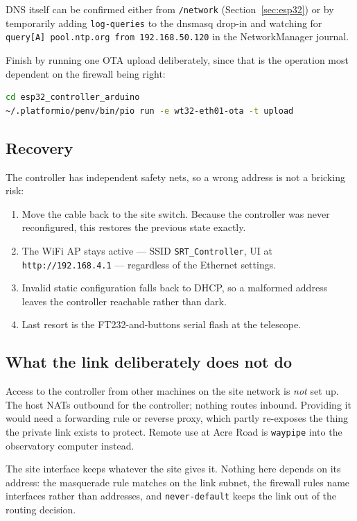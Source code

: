 \documentclass[11pt,a4paper]{article}
\begin{document}
DNS itself can be confirmed either from \texttt{/network} (Section~\ref{sec:esp32}) or by temporarily adding \texttt{log-queries} to the dnsmasq drop-in and watching for \texttt{query[A] pool.ntp.org from 192.168.50.120} in the NetworkManager journal.

Finish by running one OTA upload deliberately, since that is the operation most dependent on the firewall being right:

\begin{lstlisting}[language=bash]
cd esp32_controller_arduino
~/.platformio/penv/bin/pio run -e wt32-eth01-ota -t upload
\end{lstlisting}

\subsection{Recovery}

The controller has independent safety nets, so a wrong address is not a bricking risk:

\begin{enumerate}
    \item Move the cable back to the site switch. Because the controller was never reconfigured, this restores the previous state exactly.
    \item The WiFi AP stays active --- SSID \texttt{SRT\_Controller}, UI at \texttt{http://192.168.4.1} --- regardless of the Ethernet settings.
    \item Invalid static configuration falls back to DHCP, so a malformed address leaves the controller reachable rather than dark.
    \item Last resort is the FT232-and-buttons serial flash at the telescope.
\end{enumerate}

\subsection{What the link deliberately does not do}

Access to the controller from other machines on the site network is \emph{not} set up. The host NATs outbound for the controller; nothing routes inbound. Providing it would need a forwarding rule or reverse proxy, which partly re-exposes the thing the private link exists to protect. Remote use at Acre Road is \texttt{waypipe} into the observatory computer instead.

The site interface keeps whatever the site gives it. Nothing here depends on its address: the masquerade rule matches on the link subnet, the firewall rules name interfaces rather than addresses, and \texttt{never-default} keeps the link out of the routing decision.
\end{document}
